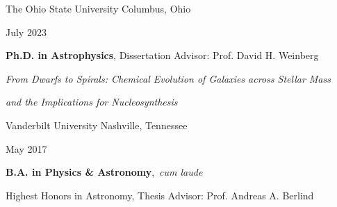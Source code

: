 \documentclass[cv.tex]{subfiles}
\begin{document}
{\color{themecolor}\large The Ohio State University}
\hfill
Columbus, Ohio
\par\noindent
\parbox{0.18\textwidth}{%
	\raggedleft
	July 2023 \par
	\null \par
	\null
}
\hspace{1mm}
\parbox{0.8\textwidth}{%
	\textbf{Ph.D. in Astrophysics}, Dissertation Advisor: Prof. David H. Weinberg
	\par
	\textit{From Dwarfs to Spirals: Chemical Evolution of
	Galaxies across Stellar Mass} \par
	\textit{and the Implications for Nucleosynthesis} \par
}

\vspace{3mm}
\noindent
{\color{themecolor}\large Vanderbilt University}
\hfill
Nashville, Tennessee
\par\noindent
\parbox{0.18\textwidth}{%
	\raggedleft
	May 2017 \par
	\null
}
\hspace{1mm}
\parbox{0.8\textwidth}{%
	\vspace{1mm}
	\textbf{B.A. in Physics \& Astronomy},~\textit{cum laude} \par
	Highest Honors in Astronomy, Thesis Advisor: Prof. Andreas A. Berlind
}
\end{document}

